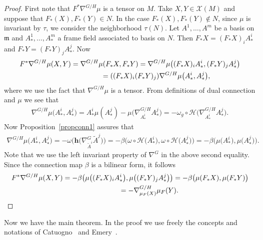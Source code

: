 \documentclass[10pt,a4paper]{amsart}
\numberwithin{equation}{section}
\newcommand{\m}{\mathfrak{m}}
\begin{document}
\begin{proof}
  First note that $F^*\nabla^{G/H}\mu$ is a tensor on $M$. Take $X, Y \in \mathcal{X}(M)$ and suppose that $F_{*}(X), F_{*}(Y) \in N$. In the case $F_{*}(X), F_{*}(Y) \notin N$, since $\mu$ is invariant by $\tau$, we consider the neighborhood $\tau(N)$. Let $A^{1}, \ldots, A^{m}$ be a basis on
  $\m$ and $A^1_*, \ldots,  A^m_*$ a frame f\/ield associated to basis on $N$. Then $F_*X = (F_*X)_{i}A^{i}_{*}$ and $F_*Y = (F_*Y)_{j}A^{j}_{*}$. Now
  \begin{gather*}
    F^*\nabla^{G/H}\mu(X, Y)
      =   \nabla^{G/H}\mu(F_*X,F_*Y)  =  \nabla^{G/H}\mu\big((F_*X)_{i}A^{i}_*,(F_*Y)_{j}A^{j}_*\big)\\
 \hphantom{F^*\nabla^{G/H}\mu(X, Y)}{} =   ((F_*X)_{i}(F_*Y)_{j})\nabla^{G/H}\mu\big(A^{i}_*,A^{j}_*\big),
  \end{gather*}
  where we use the fact that $\nabla^{G/H}\mu$ is a tensor. From def\/initions of dual connection and $\mu$ we see that
  \begin{gather*}
    \nabla^{G/H}\mu\big(A^{i}_*,A^{j}_*\big) = A^{i}_*\mu(A^{j}_*) - \mu\big(\nabla^{G/H}_{A^{i}_*}A^{j}_*\big) =
     - \omega_{g} \circ \mathcal{H} \big(\nabla^{G/H}_{A^{i}_*}A^{j}_*\big).
  \end{gather*}
  Now Proposition~\ref{propconn1} assures that
  \begin{gather*}
    \nabla^{G/H}\mu\big(A^{i}_*,A^{j}_*\big)
      =   - \omega\big( \mathbf{h}\big(\nabla^{G}_{\tilde{A}^{i}}\tilde{A}^{j}\big)\big)
      =   - \beta\big(\omega \circ \mathcal{H}\big({A}^{i}_*\big), \omega \circ \mathcal{H}\big(A^{j}_*\big)\big)
      =   - \beta\big(\mu\big({A}^{i}_*\big), \mu\big(A^{j}_*\big)\big).
  \end{gather*}
  Note that we use the left invariant property of $\nabla^{G}$ in the above second equality. Since the connection map $\beta$ is a bilinear form, it follows
  \begin{gather*}
    F^*\nabla^{G/H}\mu(X, Y)
      =   - \beta\big(\mu\big((F_*X)_{i}A^i_*\big), \mu\big((F_*Y)_{j}A^j_*\big)\big)
      =   - \beta\big(\mu(F_*X), \mu(F_*Y)\big) \\
      \hphantom{F^*\nabla^{G/H}\mu(X, Y)}{}
      =   - \nabla^{G/H}_{\mu_{F}(X)} \mu_{F}(Y) .\tag*{\qed}
  \end{gather*}
  \renewcommand{\qed}{}
\end{proof}


Now we have the main theorem. In the proof we use freely the
concepts and notations of Catuogno~\cite{Catuogno} and Emery~\cite{Emery}.
\end{document}
